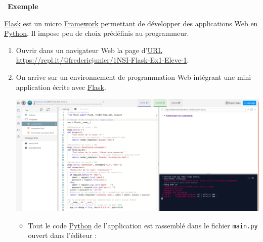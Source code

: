\documentclass[
  11pt,
]{article}
\newcommand{\passthrough}[1]{#1}
\newcounter{def}
\newcounter{exple}
\newenvironment{exemple}[1]
{\par \medskip   \addtocounter{exple}{1} \noindent  
\begin{bclogo}[arrondi =0.1,   noborder = true, logo=\bclampe, marge=4]{~\textbf{Exemple} \textbf{\theexple} {\itshape #1} }  \par}
{
\end{bclogo}
 \par \bigskip }
\newcounter{prog}
\begin{document}
\begin{exemple}{}

\href{https://flask.palletsprojects.com/en/1.1.x/}{Flask} est un micro
\href{https://fr.wikipedia.org/wiki/Framework}{Framework} permettant de
développer des applications Web en
\href{https://docs.python.org/3.7/library/cgi.html}{Python}. Il impose
peu de choix prédéfinis au programmeur.

\begin{enumerate}
\def\labelenumi{\arabic{enumi}.}
\item
  Ouvrir dans un navigateur Web la page
  d'\href{https://developer.mozilla.org/fr/docs/Glossaire/URL}{URL}
  \url{https://repl.it/@fredericjunier/1NSI-Flask-Ex1-Eleve-1}.
\item
  On arrive sur un environnement de programmation Web intégrant une mini
  application écrite avec
  \href{https://flask.palletsprojects.com/en/1.1.x/}{Flask}.

  \includegraphics{images/flask-exemple1.png}\\

  \begin{itemize}
  \item
    Tout le code
    \href{https://docs.python.org/3.7/library/cgi.html}{Python} de
    l'application est rassemblé dans le fichier
    \passthrough{\lstinline!main.py!} ouvert dans l'éditeur :


\end{itemize}
\end{enumerate}
\end{exemple}
\end{document}
